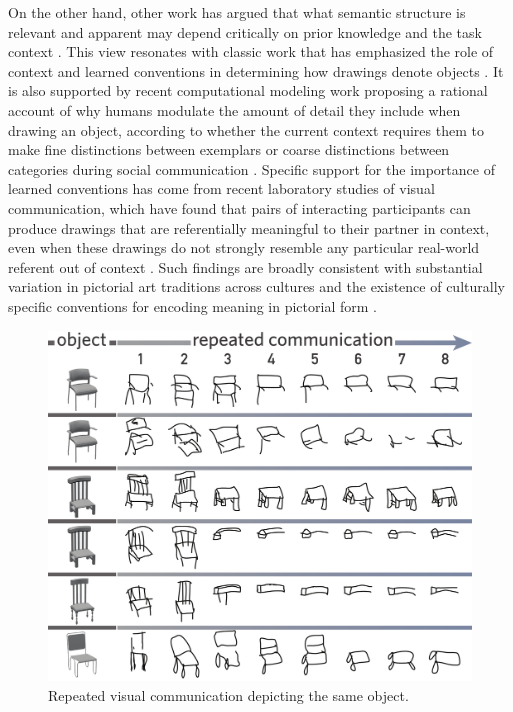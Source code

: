 \documentclass[11pt,letterpaper]{article}
\begin{document}
On the other hand, other work has argued that what semantic structure is relevant and apparent may depend critically on prior knowledge and the task context \cite{schyns1998development,goldstone1998perceptual}.
This view resonates with classic work that has emphasized the role of context and learned conventions in determining how drawings denote objects \cite{goodman1976languages,miller1973cross}.
It is also supported by recent computational modeling work proposing a rational account of why humans modulate the amount of detail they include when drawing an object, according to whether the current context requires them to make fine distinctions between exemplars or coarse distinctions between categories during social communication \cite{fan2020pragmatic}.
Specific support for the importance of learned conventions has come from recent laboratory studies of visual communication, which have found that pairs of interacting participants can produce drawings that are referentially meaningful to their partner in context, even when these drawings do not strongly resemble any particular real-world referent out of context \cite{garrod_foundations_2007,fay2010interactive,GalantucciGarrod11_ExperimentalSemiotics,galantucci2005experimental}.
Such findings are broadly consistent with substantial variation in pictorial art traditions across cultures \cite{gombrich1989story} and the existence of culturally specific conventions for encoding meaning in pictorial form \cite{hudson1960pictorial,deregowski1989real,hagen1978cultural}.

\begin{figure}
\begin{center}
\includegraphics[width=0.7\linewidth]{figures/sketch_gallery.pdf}
\caption{Repeated visual communication depicting the same object.}
\label{sketch_gallery}
\end{center}
\end{figure}
\end{document}
